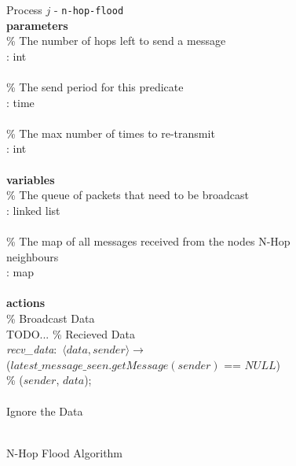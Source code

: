 \begin{figure}[H]
  \centering
  \begin{boxedminipage}{\linewidth}
    \null Process $j$ - \verb|n-hop-flood|\\
    \null \textbf{parameters}\\
    \null\qq \% The number of hops left to send a message\\
    \null\qq {}: int\\~\\
    \null\qq \% The send period for this predicate\\
    \null\qq {}: time\\~\\
    \null\qq \% The max number of times to re-transmit\\
    \null\qq {}: int\\~\\
    \null \textbf{variables}\\
    \null\qq \% The queue of packets that need to be broadcast\\
    \null\qq {}: linked list\\~\\
    \null\qq \% The map of all messages received from the nodes N-Hop neighbours\\
    \null\qq {}: map\\~\\
    \null \textbf{actions}\\
    \null\qq \% Broadcast Data\\
    TODO...
    \null\qq \% Recieved Data\\
    \null\qq \emph{recv\_data}:~$\langle data, sender\rangle \rightarrow$\\
    \null\qq\qq {} ($latest\_message\_seen.getMessage(sender)$ == $NULL$) \\
    \null\qq\qq\qq \% ($sender$, $data$);\\
    \null\qq\qq {}\\
    \null\qq\qq\qq Ignore the Data\\
    \null\qq\qq {}\\
  \end{boxedminipage}
  \caption{N-Hop Flood Algorithm}
  \label{fig:n-hop-flood-algorithm}
\end{figure}   

